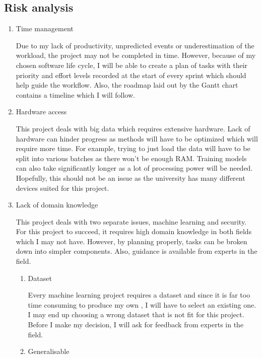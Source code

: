 \documentclass[11pt]{article}
\begin{document}
\subsection{Risk analysis}

\begin{enumerate}
  \item{Time management}

  Due to my lack of productivity, unpredicted events or underestimation of the workload, the project may not be completed in time. However, because of my chosen software life cycle, I will be able to create a plan of tasks with their priority and effort levels recorded at the start of every sprint which should help guide the workflow. Also, the roadmap laid out by the Gantt chart contains a timeline which I will follow.

  \item{Hardware access}

  This project deals with big data which requires extensive hardware. Lack of hardware can hinder progress as methods will have to be optimized which will require more time. For example, trying to just load the data will have to be split into various batches as there won’t be enough RAM. Training models can also take significantly longer as a lot of processing power will be needed. Hopefully, this should not be an issue as the university has many different devices suited for this project. 

  \item{Lack of domain knowledge}

  This project deals with two separate issues, machine learning and security. For this project to succeed, it requires high domain knowledge in both fields which I may not have. However, by planning properly, tasks can be broken down into simpler components. Also, guidance is available from experts in the field.

  \begin{enumerate}
    \item{Dataset}

    Every machine learning project requires a dataset and since it is far too time consuming to produce my own \cite{methodology-general}, I will have to select an existing one. I may end up choosing a wrong dataset that is not fit for this project. Before I make my decision, I will ask for feedback from experts in the field.

    \item{Generalisable}


\end{enumerate}
\end{enumerate}
\end{document}
